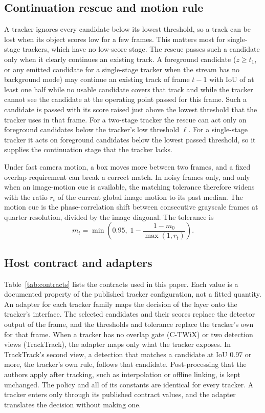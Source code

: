 \subsection{Continuation rescue and motion rule}\label{sec:rescue}
A tracker ignores every candidate below its lowest threshold, so a track can
be lost when its object scores low for a few frames. This matters most for
single-stage trackers, which have no low-score stage. The rescue passes such
a candidate only when it clearly continues an existing track. A foreground
candidate ($z\ge t_1$, or any emitted candidate for a
single-stage tracker when the stream has no background mode) may continue an
existing track of frame $t-1$ with IoU of at least one half while no usable candidate covers that
track and while the tracker cannot see the candidate at the operating point
passed for this frame. Such a candidate is passed with its score raised just
above the lowest threshold that the tracker uses in that frame. For a
two-stage tracker the rescue can act only on foreground candidates below the
tracker's low threshold $\ell$. For a single-stage tracker it acts on
foreground candidates below the lowest passed threshold, so it supplies the
continuation stage that the tracker lacks.

Under fast camera motion, a box moves more between two frames, and a fixed
overlap requirement can break a correct match. In noisy frames only, and only
when an image-motion cue is available, the matching tolerance therefore widens with the ratio $r_t$ of the current global image
motion to its past median. The motion cue is the phase-correlation shift
\cite{reddy1996phasecorr} between consecutive grayscale frames at quarter
resolution, divided by the image diagonal. The tolerance is
\begin{equation}
m_t=\min\!\left(0.95,\;1-\frac{1-m_0}{\max(1,r_t)}\right).
\label{eq:motion}
\end{equation}

\subsection{Host contract and adapters}\label{sec:contract}
Table~\ref{tab:contracts} lists the contracts used in this paper. Each value
is a documented property of the published tracker configuration, not a fitted
quantity. An adapter for each tracker family maps the decision of the layer
onto the tracker's interface. The selected candidates and their scores replace
the detector output of the frame, and the thresholds and tolerance replace the
tracker's own for that frame. When a tracker has no overlap gate (C-TWiX) or
two detection views (TrackTrack), the adapter maps only what the tracker
exposes. In TrackTrack's second view, a detection that matches a candidate at
IoU 0.97 or more, the tracker's own rule, follows that candidate.
Post-processing that the authors apply after tracking, such as interpolation
or offline linking, is kept unchanged. The policy and all of its constants are
identical for every tracker. A tracker enters only through its published
contract values, and the adapter translates the decision without making one.

